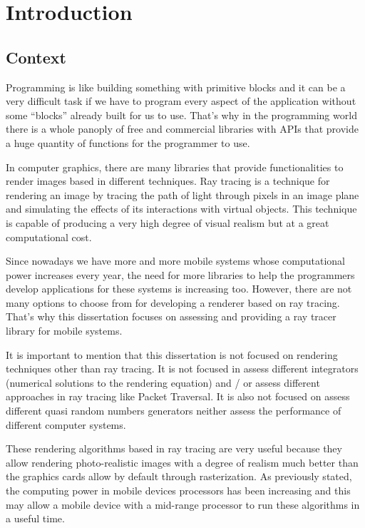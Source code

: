 \chapter{Introduction}

\section{Context}

\par
Programming is like building something with primitive blocks and it can be a very \mbox{difficult} task if we have to program every aspect of the application without some “blocks” already built for us to use.
That’s why in the programming world there is a whole panoply of free and commercial libraries with APIs that provide a huge quantity of functions for the programmer to use.

\par
In computer graphics, there are many libraries that provide functionalities to render images based in different techniques.
Ray tracing is a technique for rendering an image by tracing the path of light through pixels in an image plane and simulating the effects of its interactions with virtual objects.
This technique is capable of producing a very high degree of visual realism but at a great computational cost.

\par
Since nowadays we have more and more mobile systems whose computational power increases every year, the need for more libraries to help the programmers develop applications for these systems is increasing too.
However, there are not many options to choose from for developing a renderer based on ray tracing.
That’s why this dissertation focuses on assessing and providing a ray tracer library for mobile systems.

\par
It is important to mention that this dissertation is not focused on rendering techniques other than ray tracing.
It is not focused in assess different integrators (numerical solutions to the rendering equation) and / or assess different approaches in ray tracing like Packet Traversal.
It is also not focused on assess different quasi random numbers generators neither assess the performance of different computer systems.

\par
These rendering algorithms based in ray tracing are very useful because they allow rendering photo-realistic images with a degree of realism much better than the graphics cards allow by default through rasterization.
As previously stated, the computing power in mobile devices processors has been increasing and this may allow a mobile device with a mid-range processor to run these algorithms in a useful time.

